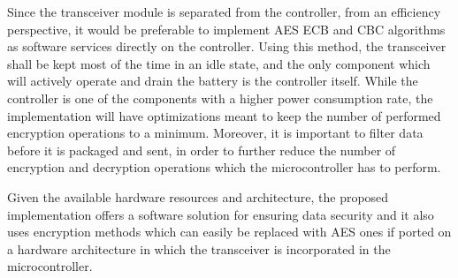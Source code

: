 Since the transceiver module is separated from the controller, from an efficiency perspective, it 
would be preferable to implement AES ECB and CBC algorithms as software services directly on the 
controller. Using this method, the transceiver shall be kept most of the time in an idle state, 
and the only component which will actively operate and drain the battery is the controller itself.
While the controller is one of the components with a higher power consumption rate, the implementation 
will have optimizations meant to keep the number of performed encryption operations to a minimum.
Moreover, it is important to filter data before it is packaged and sent, in order to further 
reduce the number of encryption and decryption operations which the microcontroller has to perform.

Given the available hardware resources and architecture, the proposed implementation offers 
a software solution for ensuring data security and it also uses encryption methods which can easily 
be replaced with AES ones if ported on a hardware architecture in which the transceiver is 
incorporated in the microcontroller.
